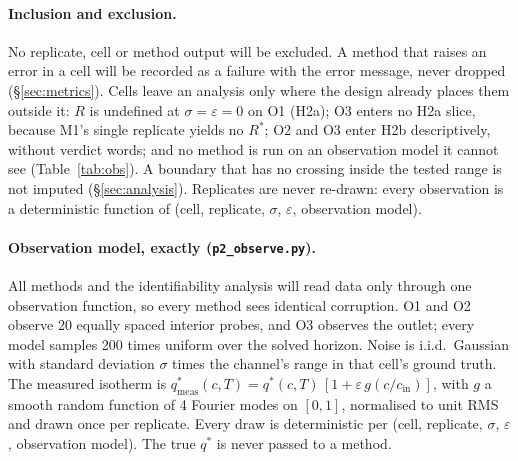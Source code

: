 \documentclass[11pt]{article}
\newcommand{\qs}{q^{*}}
\newcommand{\qsm}{q^{*}_{\mathrm{meas}}}
\begin{document}
\paragraph{Inclusion and exclusion.} No replicate, cell or method output will be
excluded. A method that raises an error in a cell will be recorded as a failure with the
error message, never dropped (\S\ref{sec:metrics}). Cells leave an analysis only where
the design already places them outside it: $R$ is undefined at $\sigma = \varepsilon = 0$
on O1 (H2a); O3 enters no H2a slice, because M1's single replicate yields no $R^{*}$; O2
and O3 enter H2b descriptively, without verdict words; and no method is run on an
observation model it cannot see (Table~\ref{tab:obs}). A boundary that has no crossing
inside the tested range is not imputed (\S\ref{sec:analysis}). Replicates are never
re-drawn: every observation is a deterministic function of (cell, replicate, $\sigma$,
$\varepsilon$, observation model).

\paragraph{Observation model, exactly (\texttt{p2\_observe.py}).}
All methods and the identifiability analysis will read data only through one observation
function, so every method sees identical corruption. O1 and O2 observe 20 equally spaced
interior probes, and O3 observes the outlet; every model samples 200 times uniform over
the solved horizon. Noise is i.i.d.\ Gaussian with standard deviation $\sigma$ times the
channel's range in that cell's ground truth. The measured isotherm is $\qsm(c,T) =
\qs(c,T)\,[1 + \varepsilon\, g(c/c_{\mathrm{in}})]$, with $g$ a smooth random function of
4 Fourier modes on $[0,1]$, normalised to unit RMS and drawn once per replicate. Every
draw is deterministic per (cell, replicate, $\sigma$, $\varepsilon$, observation model).
The true $\qs$ is never passed to a method.
\end{document}
